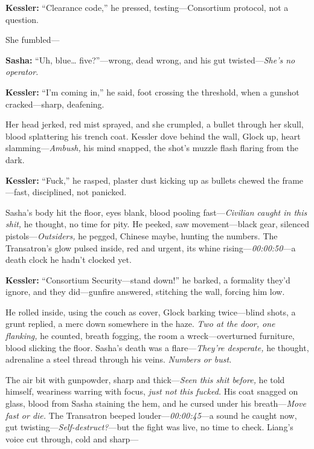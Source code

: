 \documentclass[12pt]{book}
\begin{document}
\vspace{0.5em}
\textbf{Kessler:} “Clearance code,” he pressed, testing—Consortium protocol, not a question.

She fumbled— 

\vspace{0.5em}
\textbf{Sasha:} “Uh, blue… five?”—wrong, dead wrong, and his gut twisted—\emph{She’s no operator.}

\vspace{0.5em}
\textbf{Kessler:} “I’m coming in,” he said, foot crossing the threshold, when a gunshot cracked—sharp, deafening.

Her head jerked, red mist sprayed, and she crumpled, a bullet through her skull, blood splattering his trench coat. Kessler dove behind the wall, Glock up, heart slamming—\emph{Ambush,} his mind snapped, the shot’s muzzle flash flaring from the dark. 

\vspace{0.5em}
\textbf{Kessler:} “Fuck,” he rasped, plaster dust kicking up as bullets chewed the frame—fast, disciplined, not panicked.

Sasha’s body hit the floor, eyes blank, blood pooling fast—\emph{Civilian caught in this shit,} he thought, no time for pity. He peeked, saw movement—black gear, silenced pistols—\emph{Outsiders,} he pegged, Chinese maybe, hunting the numbers. The Transatron’s glow pulsed inside, red and urgent, its whine rising—\emph{00:00:50}—a death clock he hadn’t clocked yet.

\vspace{0.5em}
\textbf{Kessler:} “Consortium Security—stand down!” he barked, a formality they’d ignore, and they did—gunfire answered, stitching the wall, forcing him low.

He rolled inside, using the couch as cover, Glock barking twice—blind shots, a grunt replied, a merc down somewhere in the haze. \emph{Two at the door, one flanking,} he counted, breath fogging, the room a wreck—overturned furniture, blood slicking the floor. Sasha’s death was a flare—\emph{They’re desperate,} he thought, adrenaline a steel thread through his veins. \emph{Numbers or bust.}

The air bit with gunpowder, sharp and thick—\emph{Seen this shit before,} he told himself, weariness warring with focus, \emph{just not this fucked.} His coat snagged on glass, blood from Sasha staining the hem, and he cursed under his breath—\emph{Move fast or die.} The Transatron beeped louder—\emph{00:00:45}—a sound he caught now, gut twisting—\emph{Self-destruct?}—but the fight was live, no time to check. Liang’s voice cut through, cold and sharp— 
\end{document}
